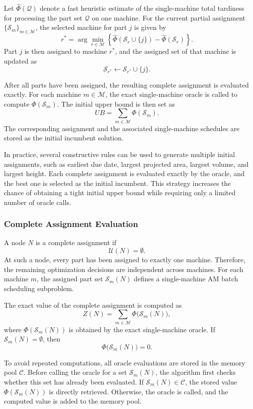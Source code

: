 \documentclass[letterpaper, 10 pt, conference]{ieeeconf}  %
\begin{document}
Let $\widehat{\Phi}(\mathcal{Q})$ denote a fast heuristic estimate of the
single-machine total tardiness for processing the part set
$\mathcal{Q}$ on one machine. For the current partial assignment
$\{\mathcal{S}_m\}_{m\in\mathcal{M}}$, the selected machine for part $j$ is
given by
\[
r^*
=
\arg\min_{r\in\mathcal{M}}
\left\{
\widehat{\Phi}(\mathcal{S}_r\cup\{j\})
-
\widehat{\Phi}(\mathcal{S}_r)
\right\}.
\]
Part $j$ is then assigned to machine $r^*$, and the assigned set of that
machine is updated as
\[
\mathcal{S}_{r^*}\leftarrow \mathcal{S}_{r^*}\cup\{j\}.
\]

After all parts have been assigned, the resulting complete assignment is
evaluated exactly. For each machine $m\in\mathcal{M}$, the exact
single-machine oracle is called to compute
$\Phi(\mathcal{S}_m)$. The initial upper bound is then set as
\[
UB
=
\sum_{m\in\mathcal{M}}
\Phi(\mathcal{S}_m).
\]
The corresponding assignment and the associated single-machine schedules
are stored as the initial incumbent solution.

In practice, several constructive rules can be used to generate multiple
initial assignments, such as earliest due date, largest projected area,
largest volume, and largest height. Each complete assignment is evaluated
exactly by the oracle, and the best one is selected as the initial
incumbent. This strategy increases the chance of obtaining a tight initial
upper bound while requiring only a limited number of oracle calls.

\subsubsection{Complete Assignment Evaluation}

A node $N$ is a complete assignment if
\[
\mathcal{U}(N)=\emptyset.
\]
At such a node, every part has been assigned to exactly one machine.
Therefore, the remaining optimization decisions are independent across
machines. For each machine $m$, the assigned part set
$\mathcal{S}_m(N)$ defines a single-machine AM batch scheduling subproblem.

The exact value of the complete assignment is computed as
\[
Z(N)
=
\sum_{m\in\mathcal{M}}
\Phi\bigl(\mathcal{S}_m(N)\bigr),
\]
where $\Phi(\mathcal{S}_m(N))$ is obtained by the exact single-machine
oracle. If $\mathcal{S}_m(N)=\emptyset$, then
\[
\Phi\bigl(\mathcal{S}_m(N)\bigr)=0.
\]

To avoid repeated computations, all oracle evaluations are stored in the
memory pool $\mathcal{C}$. Before calling the oracle for a set
$\mathcal{S}_m(N)$, the algorithm first checks whether this set has already
been evaluated. If $\mathcal{S}_m(N)\in\mathcal{C}$, the stored value
$\Phi(\mathcal{S}_m(N))$ is directly retrieved. Otherwise, the oracle is
called, and the computed value is added to the memory pool.
\end{document}
